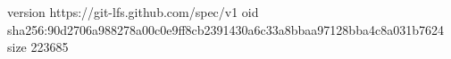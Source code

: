 version https://git-lfs.github.com/spec/v1
oid sha256:90d2706a988278a00c0e9ff8cb2391430a6c33a8bbaa97128bba4c8a031b7624
size 223685
